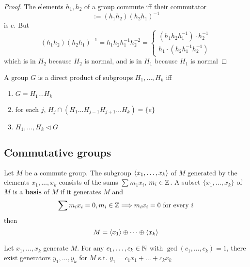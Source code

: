 \documentclass[11pt]{article}
\begin{document}
\begin{proof}
The elements \(h_1,h_2\) of a group commute iff their commutator
\begin{equation*}
[h_1,h_2]:=(h_1h_2)(h_2h_1)^{-1}
\end{equation*}
is \(e\). But
\begin{equation*}
(h_1h_2)(h_2h_1)^{-1}=h_1h_2h_1^{-1}h_2^{-2}=
\begin{cases}
(h_1h_2h_1^{-1})\cdot h_2^{-1}\\
h_1\cdot(h_2h_1^{-1}h_2^{-1})
\end{cases}
\end{equation*}
which is in \(H_2\) because \(H_2\) is normal, and is in \(H_1\) because \(H_1\) is normal
\end{proof}

\begin{proposition}[]
A group \(G\) is a direct product of subgroups \(H_1,\dots,H_k\) iff
\begin{enumerate}
\item \(G=H_1\dots H_k\)
\item for each \(j\), \(H_j\cap(H_1\dots H_{j-1}H_{j+1}\dots H_k)=\{e\}\)
\item \(H_1,\dots,H_k\lhd G\)
\end{enumerate}
\end{proposition}
\subsection{Commutative groups}
\label{sec:org3a7d301}
Let \(M\) be a commute group. The subgroup \(\langle x_1,\dots,x_k\rangle\) of \(M\) generated by the
elements \(x_1,\dots,x_k\) consists of the sums \(\sum m_1x_i\), \(m_i\in\mathbb{Z}\). A subset \(\{x_1,\dots,x_k\}\)
of \(M\) is a \textbf{basis} of \(M\) if it generates \(M\) and
\begin{equation*}
\sum m_ix_i=0,m_i\in\mathbb{Z}\Longrightarrow m_ix_i=0\text{ for every }i
\end{equation*}
then
\begin{equation*}
M=\langle x_1\rangle\oplus\dots\oplus\langle x_k\rangle
\end{equation*}

\begin{lemma}[]
Let \(x_1,\dots,x_k\) generate \(M\). For any \(c_1,\dots,c_k\in\mathbb{N}\) with \(\gcd(c_1,\dots,c_k)=1\), there exist
generators \(y_1,\dots,y_k\) for \(M\) s.t. \(y_1=c_1x_1+\dots+c_kx_k\)
\end{lemma}
\end{document}
